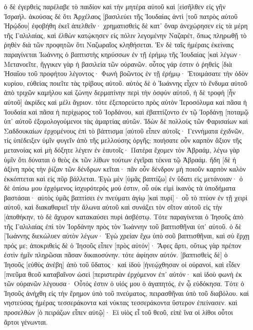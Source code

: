 ὁ δὲ ἐγερθεὶς παρέλαβε τὸ παιδίον καὶ τὴν μητέρα αὐτοῦ καὶ [εἰσῆλθεν εἰς γῆν Ἰσραήλ. 
ἀκούσας δὲ ὅτι Ἀρχέλαος [βασιλεύει τῆς Ἰουδαίας ἀντὶ [τοῦ πατρὸς αὐτοῦ Ἡρῴδου] ἐφοβήθη ἐκεῖ ἀπελθεῖν· χρηματισθεὶς δὲ κατ᾽ ὄναρ ἀνεχώρησεν εἰς τὰ μέρη τῆς Γαλιλαίας, 
καὶ ἐλθὼν κατῴκησεν εἰς πόλιν λεγομένην Ναζαρέτ, ὅπως πληρωθῇ τὸ ῥηθὲν διὰ τῶν προφητῶν ὅτι Ναζωραῖος κληθήσεται. 
Ἐν δὲ ταῖς ἡμέραις ἐκείναις παραγίνεται Ἰωάννης ὁ βαπτιστὴς κηρύσσων ἐν τῇ ἐρήμῳ τῆς Ἰουδαίας 
[καὶ λέγων· Μετανοεῖτε, ἤγγικεν γὰρ ἡ βασιλεία τῶν οὐρανῶν. 
οὗτος γάρ ἐστιν ὁ ῥηθεὶς [διὰ Ἠσαΐου τοῦ προφήτου λέγοντος· Φωνὴ βοῶντος ἐν τῇ ἐρήμῳ· Ἑτοιμάσατε τὴν ὁδὸν κυρίου, εὐθείας ποιεῖτε τὰς τρίβους αὐτοῦ. 
αὐτὸς δὲ ὁ Ἰωάννης εἶχεν τὸ ἔνδυμα αὐτοῦ ἀπὸ τριχῶν καμήλου καὶ ζώνην δερματίνην περὶ τὴν ὀσφὺν αὐτοῦ, ἡ δὲ τροφὴ [ἦν αὐτοῦ] ἀκρίδες καὶ μέλι ἄγριον. 
τότε ἐξεπορεύετο πρὸς αὐτὸν Ἱεροσόλυμα καὶ πᾶσα ἡ Ἰουδαία καὶ πᾶσα ἡ περίχωρος τοῦ Ἰορδάνου, 
καὶ ἐβαπτίζοντο ἐν τῷ Ἰορδάνῃ [ποταμῷ ὑπ᾽ αὐτοῦ ἐξομολογούμενοι τὰς ἁμαρτίας αὐτῶν. 
Ἰδὼν δὲ πολλοὺς τῶν Φαρισαίων καὶ Σαδδουκαίων ἐρχομένους ἐπὶ τὸ βάπτισμα [αὐτοῦ εἶπεν αὐτοῖς· Γεννήματα ἐχιδνῶν, τίς ὑπέδειξεν ὑμῖν φυγεῖν ἀπὸ τῆς μελλούσης ὀργῆς; 
ποιήσατε οὖν καρπὸν ἄξιον τῆς μετανοίας 
καὶ μὴ δόξητε λέγειν ἐν ἑαυτοῖς· Πατέρα ἔχομεν τὸν Ἀβραάμ, λέγω γὰρ ὑμῖν ὅτι δύναται ὁ θεὸς ἐκ τῶν λίθων τούτων ἐγεῖραι τέκνα τῷ Ἀβραάμ. 
ἤδη [δὲ ἡ ἀξίνη πρὸς τὴν ῥίζαν τῶν δένδρων κεῖται· πᾶν οὖν δένδρον μὴ ποιοῦν καρπὸν καλὸν ἐκκόπτεται καὶ εἰς πῦρ βάλλεται. 
Ἐγὼ μὲν [ὑμᾶς βαπτίζω] ἐν ὕδατι εἰς μετάνοιαν· ὁ δὲ ὀπίσω μου ἐρχόμενος ἰσχυρότερός μού ἐστιν, οὗ οὐκ εἰμὶ ἱκανὸς τὰ ὑποδήματα βαστάσαι· αὐτὸς ὑμᾶς βαπτίσει ἐν πνεύματι ἁγίῳ [καὶ πυρί]· 
οὗ τὸ πτύον ἐν τῇ χειρὶ αὐτοῦ, καὶ διακαθαριεῖ τὴν ἅλωνα αὐτοῦ καὶ συνάξει τὸν σῖτον αὐτοῦ εἰς τὴν [ἀποθήκην, τὸ δὲ ἄχυρον κατακαύσει πυρὶ ἀσβέστῳ. 
Τότε παραγίνεται ὁ Ἰησοῦς ἀπὸ τῆς Γαλιλαίας ἐπὶ τὸν Ἰορδάνην πρὸς τὸν Ἰωάννην τοῦ βαπτισθῆναι ὑπ᾽ αὐτοῦ. 
ὁ δὲ [Ἰωάννης διεκώλυεν αὐτὸν λέγων· Ἐγὼ χρείαν ἔχω ὑπὸ σοῦ βαπτισθῆναι, καὶ σὺ ἔρχῃ πρός με; 
ἀποκριθεὶς δὲ ὁ Ἰησοῦς εἶπεν [πρὸς αὐτόν]· Ἄφες ἄρτι, οὕτως γὰρ πρέπον ἐστὶν ἡμῖν πληρῶσαι πᾶσαν δικαιοσύνην. τότε ἀφίησιν αὐτόν. 
[βαπτισθεὶς δὲ] ὁ Ἰησοῦς [εὐθὺς ἀνέβη] ἀπὸ τοῦ ὕδατος· καὶ ἰδοὺ [ἠνεῴχθησαν οἱ οὐρανοί, καὶ εἶδεν [πνεῦμα θεοῦ καταβαῖνον ὡσεὶ [περιστερὰν ἐρχόμενον ἐπ᾽ αὐτόν· 
καὶ ἰδοὺ φωνὴ ἐκ τῶν οὐρανῶν λέγουσα· Οὗτός ἐστιν ὁ υἱός μου ὁ ἀγαπητός, ἐν ᾧ εὐδόκησα. 
Τότε ὁ Ἰησοῦς ἀνήχθη εἰς τὴν ἔρημον ὑπὸ τοῦ πνεύματος, πειρασθῆναι ὑπὸ τοῦ διαβόλου. 
καὶ νηστεύσας ἡμέρας τεσσεράκοντα καὶ νύκτας τεσσεράκοντα ὕστερον ἐπείνασεν. 
καὶ προσελθὼν [ὁ πειράζων εἶπεν αὐτῷ]· Εἰ υἱὸς εἶ τοῦ θεοῦ, εἰπὲ ἵνα οἱ λίθοι οὗτοι ἄρτοι γένωνται. 
